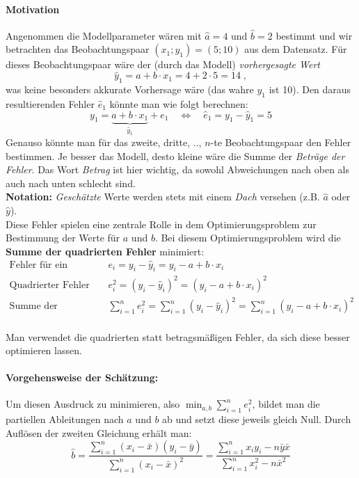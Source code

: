 \documentclass[a4paper]{article}
\newcommand\dangersign{%
 \makebox[1.8em][c]{%
 \makebox[0pt][c]{\raisebox{.15em}{\small!}}%
 \makebox[0pt][c]{\color{red}\Large$\triangle$}}}%
\begin{document}
\paragraph{Motivation} Angenommen die Modellparameter wären mit $\hat a = 4$ und $\hat b = 2$ bestimmt und wir betrachten das Beobachtungspaar $(x_1; y_1) = (5; 10)$ aus dem Datensatz. Für dieses Beobachtungspaar wäre der (durch das Modell) \textit{vorhergesagte Wert} 
$$\hat y_1 = a + b \cdot x_1 = 4 + 2 \cdot 5 = 14\;,$$
\noindent was keine besonders akkurate Vorhersage wäre (das wahre $y_1$ ist 10). Den daraus resultierenden Fehler $\hat e_1$ könnte man wie folgt berechnen:
$$y_1 = \underbrace{a + b \cdot x_1}_{\hat y_1} + e_1 \quad \Leftrightarrow \quad \hat e_1 = y_1 - \hat y_1 = 5$$
\noindent Genauso könnte man für das zweite, dritte, .., $n$-te Beobachtungspaar den Fehler bestimmen. Je besser das Modell, desto kleine wäre die Summe der \textit{Beträge der Fehler}. Das Wort \textit{Betrag} ist hier wichtig, da sowohl Abweichungen nach oben als auch nach unten schlecht sind.\\

\noindent \dangersign \textbf{Notation:} \textit{Geschätzte} Werte werden stets mit einem \textit{Dach} versehen (z.B. $\hat a$ oder $\hat y$).\\

\noindent Diese Fehler spielen eine zentrale Rolle in dem Optimierungsproblem zur Bestimmung der Werte für $a$ und $b$. Bei diesem Optimierungsproblem wird die \textbf{Summe der quadrierten Fehler} minimiert:
\begin{align*}
    \mbox{Fehler für ein Beobachtungspaar:} &\quad e_i = y_i - \hat y_i = y_i - a + b \cdot x_i\\
    \mbox{Quadrierter Fehler für ein Beobachtungspaar:} &\quad e_i^2 = (y_i - \hat y_i)^2 = (y_i - a + b \cdot x_i)^2\\
    \mbox{Summe der quadrierten Fehler:} &\quad \sum_{i=1}^n e_i^2 = \sum_{i=1}^n (y_i - \hat y_i)^2 = \sum_{i=1}^n (y_i - a + b \cdot x_i)^2\\
\end{align*}

\noindent Man verwendet die quadrierten statt betragsmäßigen Fehler, da sich diese besser optimieren lassen.

\paragraph{Vorgehensweise der Schätzung:} Um diesen Ausdruck zu minimieren, also $\min_{a,b} \sum_{i=1}^n e_i^2$, bildet man die partiellen Ableitungen nach $a$ und $b$ ab und setzt diese jeweils gleich Null. Durch Auflösen der zweiten Gleichung erhält man: 
$$\hat{b}=\frac{\sum_{i=1}^n(x_i-\bar{x})(y_i-\bar{y})}{\sum_{i=1}^n(x_i-\bar{x})^{2}}=\frac{\sum_{i=1}^nx_iy_i-n\bar{y}\bar{x}}{\sum_{i=1}^nx_i^{2}-n\bar{x}^{2}}$$
\end{document}
